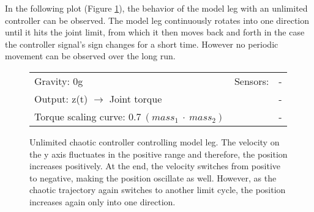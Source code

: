 \documentclass[main]{subfiles}
\begin{document}
In the following plot (Figure \ref{figure:unlimited-model-leg}), the behavior of the model leg with an unlimited controller can be observed. %
%
The model leg continuously rotates into one direction until it hits the joint limit, from which it then moves back and forth in the case the controller signal's sign changes for a short time. %
%
However no periodic movement can be observed over the long run. %

\begin{figure}[H]
	\centering
	\begin{minipage}{1.3\textwidth}
	\hspace*{-5em}
	\end{minipage}
	\caption[Unlimited chaotic controller controlling model leg.]{Unlimited chaotic controller controlling model leg. The velocity on the y axis fluctuates in the positive range and therefore, the position increases positively. At the end, the velocity switches from positive to negative, making the position oscillate as well. However, as the chaotic trajectory again switches to another limit cycle, the position increases again only into one direction.}
	\begin{tabular}{l|ll}
	\hline 
	Gravity: 0g  & Sensors: & - \\
	 Output: z(t) \(\rightarrow\) Joint torque & & - \\
	  Torque scaling curve: \(0.7~(mass_1~\cdot~mass_2)\) & & - \\
	  \hline
	\end{tabular}

	\label{figure:unlimited-model-leg}
\end{figure}
\end{document}
